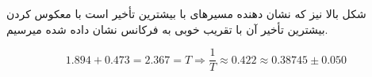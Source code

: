 \documentclass{article}
\begin{document}
\begin{enumerate}[label=\textbf{\alph*)}]
شکل بالا نیز که نشان دهنده مسیرهای با بیشترین تأخیر است با معکوس کردن بیشترین تأخیر آن با تقریب خوبی
به فرکانس نشان داده شده میرسیم.

\begin{large}
    $$1.894 + 0.473 = 2.367 = T \Rightarrow \frac{1}{T} \approx 0.422 \approx 0.38745 \pm 0.050$$
\end{large}
\end{enumerate}
\end{document}
